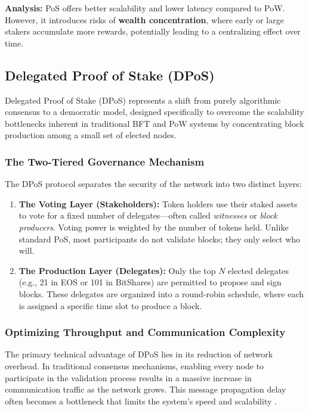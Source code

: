 \textbf{Analysis:} 
PoS offers better scalability and lower latency compared to PoW. However, it introduces risks of \textbf{wealth concentration}, where early or large stakers accumulate more rewards, potentially leading to a centralizing effect over time.

\subsection{Delegated Proof of Stake (DPoS)}
Delegated Proof of Stake (DPoS) \cite{springer2025_dpos_scalability} represents a shift from purely algorithmic consensus to a democratic model, designed specifically to overcome the scalability bottlenecks inherent in traditional BFT and PoW systems by concentrating block production among a small set of elected nodes.

\subsubsection{The Two-Tiered Governance Mechanism}
The DPoS protocol separates the security of the network into two distinct layers:
\begin{enumerate}
    \item \textbf{The Voting Layer (Stakeholders):} Token holders use their staked assets to vote for a fixed number of delegates—often called \textit{witnesses} or \textit{block producers}. Voting power is weighted by the number of tokens held. Unlike standard PoS, most participants do not validate blocks; they only select who will.
    \item \textbf{The Production Layer (Delegates):} Only the top $N$ elected delegates (e.g., 21 in EOS or 101 in BitShares) are permitted to propose and sign blocks. These delegates are organized into a round-robin schedule, where each is assigned a specific time slot to produce a block.
\end{enumerate}


\subsubsection{Optimizing Throughput and Communication Complexity}
The primary technical advantage of DPoS lies in its reduction of network overhead. In traditional consensus mechanisms, enabling every node to participate in the validation process results in a massive increase in communication traffic as the network grows. This message propagation delay often becomes a bottleneck that limits the system's speed and scalability \cite{CastroLiskov1999}.


